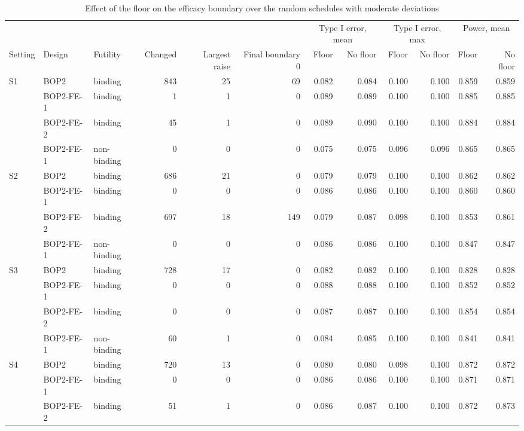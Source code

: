 \begin{table}
\centering
\caption{Effect of the floor on the efficacy boundary over the random schedules with moderate deviations}
\label{tab:floor}
\scriptsize
\setlength{\tabcolsep}{3pt}
\begin{tabular}{lllrrrrrrrrr}
\toprule
 & & & & & & \multicolumn{2}{c}{Type I error, mean} & \multicolumn{2}{c}{Type I error, max} & \multicolumn{2}{c}{Power, mean} \\
\cmidrule(lr){7-8}\cmidrule(lr){9-10}\cmidrule(lr){11-12}
Setting & Design & Futility & Changed & Largest raise & Final boundary 0 & Floor & No floor & Floor & No floor & Floor & No floor \\
\midrule
S1 & BOP2 & binding & 843 & 25 & 69 & 0.082 & 0.084 & 0.100 & 0.100 & 0.859 & 0.859 \\
 & BOP2-FE-1 & binding & 1 & 1 & 0 & 0.089 & 0.089 & 0.100 & 0.100 & 0.885 & 0.885 \\
 & BOP2-FE-2 & binding & 45 & 1 & 0 & 0.089 & 0.090 & 0.100 & 0.100 & 0.884 & 0.884 \\
 & BOP2-FE-1 & non-binding & 0 & 0 & 0 & 0.075 & 0.075 & 0.096 & 0.096 & 0.865 & 0.865 \\
\midrule
S2 & BOP2 & binding & 686 & 21 & 0 & 0.079 & 0.079 & 0.100 & 0.100 & 0.862 & 0.862 \\
 & BOP2-FE-1 & binding & 0 & 0 & 0 & 0.086 & 0.086 & 0.100 & 0.100 & 0.860 & 0.860 \\
 & BOP2-FE-2 & binding & 697 & 18 & 149 & 0.079 & 0.087 & 0.098 & 0.100 & 0.853 & 0.861 \\
 & BOP2-FE-1 & non-binding & 0 & 0 & 0 & 0.086 & 0.086 & 0.100 & 0.100 & 0.847 & 0.847 \\
\midrule
S3 & BOP2 & binding & 728 & 17 & 0 & 0.082 & 0.082 & 0.100 & 0.100 & 0.828 & 0.828 \\
 & BOP2-FE-1 & binding & 0 & 0 & 0 & 0.088 & 0.088 & 0.100 & 0.100 & 0.852 & 0.852 \\
 & BOP2-FE-2 & binding & 0 & 0 & 0 & 0.087 & 0.087 & 0.100 & 0.100 & 0.854 & 0.854 \\
 & BOP2-FE-1 & non-binding & 60 & 1 & 0 & 0.084 & 0.085 & 0.100 & 0.100 & 0.841 & 0.841 \\
\midrule
S4 & BOP2 & binding & 720 & 13 & 0 & 0.080 & 0.080 & 0.098 & 0.100 & 0.872 & 0.872 \\
 & BOP2-FE-1 & binding & 0 & 0 & 0 & 0.086 & 0.086 & 0.100 & 0.100 & 0.871 & 0.871 \\
 & BOP2-FE-2 & binding & 51 & 1 & 0 & 0.086 & 0.087 & 0.100 & 0.100 & 0.872 & 0.873 \\

\end{tabular}
\end{table}
